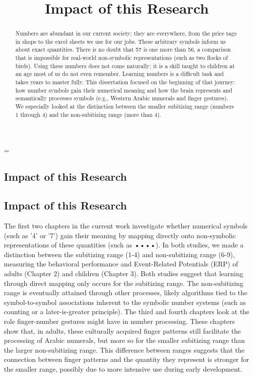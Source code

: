 \emergencystretch=\maxdimen
{}


\begin{refsection}

\title{Impact of this Research}

\chapter{Impact of this Research}

\vspace{-2cm}

\section*{Impact of this Research}
\begin{abstract}
Numbers are abundant in our current society; they are everywhere, from the price tags in shops to the excel sheets we use for our jobs. These arbitrary symbols inform us about exact quantities. There is no doubt that 57 is one more than 56, a comparison that is impossible for real-world non-symbolic representations (such as two flocks of birds). Using these numbers does not come naturally; it is a skill taught to children at an age most of us do not even remember. Learning numbers is a difficult task and takes years to master fully. This dissertation focused on the beginning of that journey: how number symbols gain their numerical meaning and how the brain represents and semantically processes symbols (e.g., Western Arabic numerals and finger gestures). We especially looked at the distinction between the smaller subitizing range (numbers 1 through 4) and the non-subitizing range (more than 4). 
\end{abstract}

\newpage
\AddLabels

The first two chapters in the current work investigate whether numerical symbols (such as '4' or '7') gain their meaning by mapping directly onto non-symbolic representations of these quantities (such as ••••). In both studies, we made a distinction between the subitizing range (1-4) and non-subitizing range (6-9), measuring the behavioral performance and Event-Related Potentials (ERP) of adults (Chapter 2) and children (Chapter 3). Both studies suggest that learning through direct mapping only occurs for the subitizing range. The non-subitizing range is eventually attained through other processes, likely algorithms tied to the symbol-to-symbol associations inherent to the symbolic number systems (such as counting or a later-is-greater principle). The third and fourth chapters look at the role finger-number gestures might have in number processing. These chapters show that, in adults, these culturally acquired finger patterns still facilitate the processing of Arabic numerals, but more so for the smaller subitizing range than the larger non-subitizing range. This difference between ranges suggests that the connection between finger patterns and the quantity they represent is stronger for the smaller range, possibly due to more intensive use during early development.


\end{refsection}

